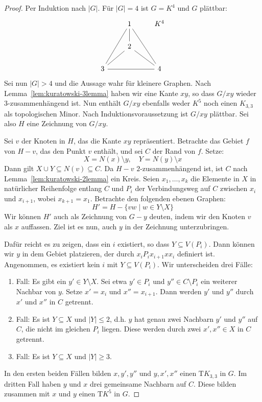 \documentclass[10pt,b5paper]{article}
\begin{document}
\begin{proof}
Per Induktion nach $|G|$. Für $|G|=4$ ist $G = K^4$ und $G$ plättbar:
\[\begin{tikzcd}
& 1\ar[d, -]\ar[ldd, -]\ar[rdd, -] & K^4\\
& 2\ar[ld, -]\ar[rd, -] & \\
3\ar[rr, -] & & 4
\end{tikzcd}\]
Sei nun $|G|>4$ und die Aussage wahr für kleinere Graphen. Nach Lemma~\ref{lem:kuratowski-3lemma} haben wir eine Kante $xy$, so dass $G/xy$ wieder $3$-zusammenhängend ist. Nun enthält $G/xy$ ebenfalls weder $K^5$ noch einen $K_{3,3}$ als topologischen Minor. Nach Induktionsvoraussetzung ist $G/xy$ plättbar. Sei also $H$ eine Zeichnung von $G/xy$.

Sei $v$ der Knoten in $H$, das die Kante $xy$ repräsentiert. Betrachte das Gebiet $f$ von $H-v$, das den Punkt $v$ enthält, und sei $C$ der Rand von $f$. Setze:
\[ X = N(x) \setminus{y},\quad Y = N(y)\setminus{x} \]
Dann gilt $X\cup Y\subseteq N(v)\subseteq C$. Da $H-v$ $2$-zusammenhängend ist, ist $C$ nach Lemma~\ref{lem:kuratowski-2lemma} ein Kreis. Seien $x_1,\ldots, x_k$ die Elemente in $X$ in natürlicher Reihenfolge entlang $C$ und $P_i$ der Verbindungsweg auf $C$ zwischen $x_i$ und $x_{i+1}$, wobei $x_{k+1} = x_1$. Betrachte den folgenden ebenen Graphen:
\[ H' = H - \{vw \mid w\in Y\setminus X\} \]
Wir können $H'$ auch als Zeichnung von $G-y$ deuten, indem wir den Knoten $v$ als $x$ auffassen. Ziel ist es nun, auch $y$ in der Zeichnung unterzubringen. 

Dafür reicht es zu zeigen, dass ein $i$ existiert, so dass $Y\subseteq V(P_i)$. Dann können wir $y$ in dem Gebiet platzieren, der durch $x_i P_i x_{i+1} x x_i$ definiert ist. Angenommen, es existiert kein $i$ mit $Y\subseteq V(P_i)$. Wir unterscheiden drei Fälle:
\begin{enumerate}
\item Fall: Es gibt ein $y'\in Y\setminus X$. Sei etwa $y'\in P_i$ und $y''\in C\setminus P_i$ ein weiterer Nachbar von $y$. Setze $x'=x_i$ und $x''=x_{i+1}$. Dann werden $y'$ und $y''$ durch $x'$ und $x''$ in $C$ getrennt.
\item Fall: Es ist $Y\subseteq X$ und $|Y| \leq 2$, d.h. $y$ hat genau zwei Nachbarn $y'$ und $y''$ auf $C$, die nicht im gleichen $P_i$ liegen. Diese werden durch zwei $x',x''\in X$ in $C$ getrennt.
\item Fall: Es ist $Y\subseteq X$ und $|Y|\geq 3$.
\end{enumerate}
In den ersten beiden Fällen bilden $x,y',y''$ und $y,x',x''$ einen $\mathrm{T}K_{3,3}$ in $G$. Im dritten Fall haben $y$ und $x$ drei gemeinsame Nachbarn auf $C$. Diese bilden zusammen mit $x$ und $y$ einen $\mathrm{T}K^5$ in $G$.
\end{proof}
\end{document}
